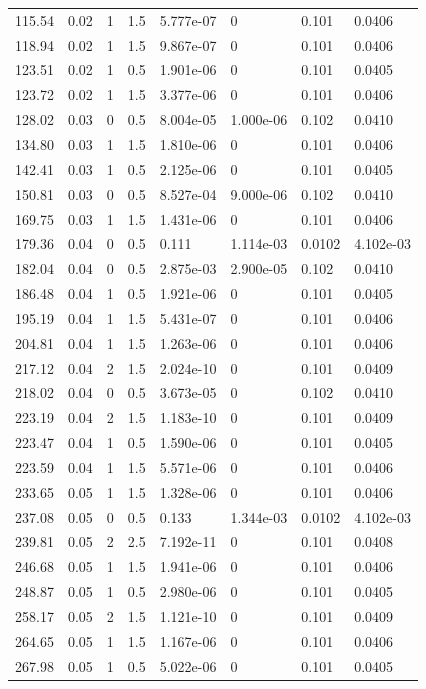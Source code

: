 \documentclass[preview]{standalone}
\begin{document}
{{\begin{tabular}{L{1.2cm}C{1.2cm} C{0.3cm}C{0.5cm} C{1.4cm}C{1.4cm} C{1.4cm}C{1.4cm}}
  115.54  &  0.02  & 1     & 1.5 &  5.777e-07  & 0  & 0.101 &  0.0406   \\ 
  118.94  &  0.02  & 1     & 1.5 &  9.867e-07  & 0  & 0.101 &  0.0406   \\ 
  123.51  &  0.02  & 1     & 0.5 &  1.901e-06  & 0  & 0.101 &  0.0405   \\ 
  123.72  &  0.02  & 1     & 1.5 &  3.377e-06  & 0  & 0.101 &  0.0406   \\ 
  128.02  &  0.03  & 0     & 0.5 &  8.004e-05  & 1.000e-06  & 0.102 &  0.0410   \\ 
  134.80  &  0.03  & 1     & 1.5 &  1.810e-06  & 0  & 0.101 &  0.0406   \\ 
  142.41  &  0.03  & 1     & 0.5 &  2.125e-06  & 0  & 0.101 &  0.0405   \\ 
  150.81  &  0.03  & 0     & 0.5 &  8.527e-04  & 9.000e-06  & 0.102 &  0.0410   \\ 
  169.75  &  0.03  & 1     & 1.5 &  1.431e-06  & 0  & 0.101 &  0.0406   \\ 
  179.36  &  0.04  & 0     & 0.5 &  0.111  & 1.114e-03  & 0.0102 &  4.102e-03   \\ 
  182.04  &  0.04  & 0     & 0.5 &  2.875e-03  & 2.900e-05  & 0.102 &  0.0410   \\ 
  186.48  &  0.04  & 1     & 0.5 &  1.921e-06  & 0  & 0.101 &  0.0405   \\ 
  195.19  &  0.04  & 1     & 1.5 &  5.431e-07  & 0  & 0.101 &  0.0406   \\ 
  204.81  &  0.04  & 1     & 1.5 &  1.263e-06  & 0  & 0.101 &  0.0406   \\ 
  217.12  &  0.04  & 2     & 1.5 &  2.024e-10  & 0  & 0.101 &  0.0409   \\ 
  218.02  &  0.04  & 0     & 0.5 &  3.673e-05  & 0  & 0.102 &  0.0410   \\ 
  223.19  &  0.04  & 2     & 1.5 &  1.183e-10  & 0  & 0.101 &  0.0409   \\ 
  223.47  &  0.04  & 1     & 0.5 &  1.590e-06  & 0  & 0.101 &  0.0405   \\ 
  223.59  &  0.04  & 1     & 1.5 &  5.571e-06  & 0  & 0.101 &  0.0406   \\ 
  233.65  &  0.05  & 1     & 1.5 &  1.328e-06  & 0  & 0.101 &  0.0406   \\ 
  237.08  &  0.05  & 0     & 0.5 &  0.133  & 1.344e-03  & 0.0102 &  4.102e-03   \\ 
  239.81  &  0.05  & 2     & 2.5 &  7.192e-11  & 0  & 0.101 &  0.0408   \\ 
  246.68  &  0.05  & 1     & 1.5 &  1.941e-06  & 0  & 0.101 &  0.0406   \\ 
  248.87  &  0.05  & 1     & 0.5 &  2.980e-06  & 0  & 0.101 &  0.0405   \\ 
  258.17  &  0.05  & 2     & 1.5 &  1.121e-10  & 0  & 0.101 &  0.0409   \\ 
  264.65  &  0.05  & 1     & 1.5 &  1.167e-06  & 0  & 0.101 &  0.0406   \\ 
  267.98  &  0.05  & 1     & 0.5 &  5.022e-06  & 0  & 0.101 &  0.0405   \\ 
\hline 
\end{tabular} 

}}
\end{document}
